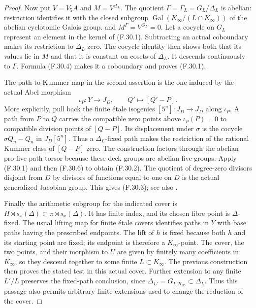 \begin{proof}
Now put $V=V_5A$ and $M=V^{\Delta_L}$.
The quotient $\Gamma=\Gamma_L=G_L/\Delta_L$ is
abelian: restriction identifies it with the closed
subgroup $\operatorname{Gal}(K_\infty/(L\cap K_\infty))$
of the abelian cyclotomic Galois group.
and
$M^\Gamma=V^{G_L}=0$.
Let a cocycle on $G_L$ represent an element in the
kernel of (F.30.1).  Subtracting an actual coboundary
makes its restriction to $\Delta_L$ zero.
The cocycle identity then shows both that its values
lie in $M$ and that it is constant on cosets of $\Delta_L$.
It descends continuously to $\Gamma$.
Formula (F.30.4) makes it a coboundary and proves
(F.30.1).

The path-to-Kummer map in the second assertion is the
one induced by the actual Abel morphism
\[
                  \iota_P:Y\longrightarrow J_D,\qquad
                    Q'\longmapsto[Q'-P].
                                                        \tag{F.30.7}
\]
More explicitly, pull back the finite \'etale isogenies
$[5^n]:J_D\to J_D$ along $\iota_P$.
A path from $P$ to $Q$ carries the compatible zero
points above $\iota_P(P)=0$ to compatible division
points of $[Q-P]$.
Its displacement under $\sigma$ is the cocycle
$\sigma Q_n-Q_n$ in $J_D[5^n]$.
Thus a $\Delta_L$-fixed path makes the restriction of
the rational Kummer class of $[Q-P]$ zero.
The construction factors through the abelian pro-five
path torsor because these deck groups are abelian
five-groups.
Apply (F.30.1) and then (F.30.6) to obtain
(F.30.2).
The quotient of degree-zero divisors disjoint from $D$
by divisors of functions equal to one on $D$ is the
actual generalized-Jacobian group.  This gives
(F.30.3); see also \cite[\S2.1, equation (2.2),
and \S2.3, Lemma~2.5]{BC_Creutz2019}.

Finally the arithmetic subgroup for the indicated
cover is
$H\rtimes s_x(\Delta)\subset\pi\rtimes s_x(\Delta)$.
It has finite index, and its chosen fibre point is
$\Delta$-fixed.  The usual lifting map for finite
\'etale covers identifies paths in $Y$ with base
paths having the prescribed endpoints.
The lift of $h$ is fixed because both $h$ and its
starting point are fixed; its endpoint is therefore
a $K_\infty$-point.
The cover, the two points, and their morphism to $U$
are given by finitely many coefficients in
$K_\infty$, so they descend together to some finite
$L\subset K_\infty$.
The previous construction then proves the stated
test in this actual cover.
Further extension to any finite $L'/L$ preserves the
fixed-path conclusion, since
$\Delta_{L'}=G_{L'K_\infty}\subset\Delta_L$.
Thus this passage also permits arbitrary finite
extensions used to change the reduction of the cover.
\end{proof}

